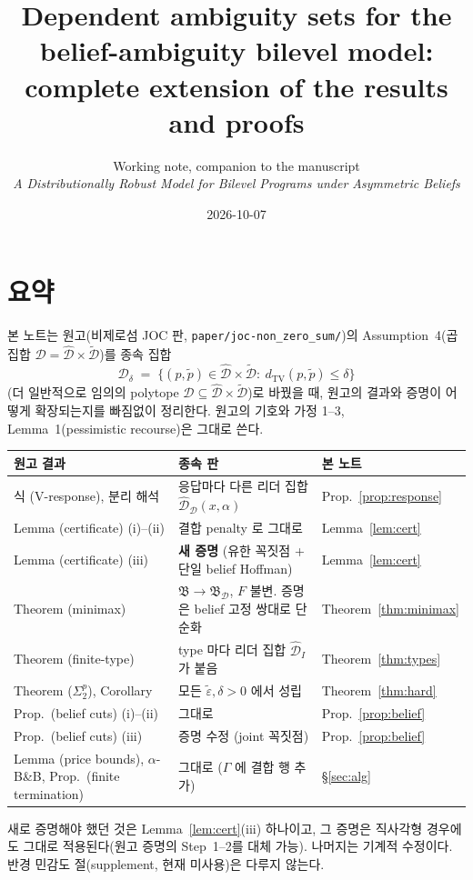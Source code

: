 \documentclass[11pt]{article}
\title{Dependent ambiguity sets for the belief-ambiguity bilevel model:\\ complete extension of the results and proofs}
\author{Working note, companion to the manuscript\\ \emph{A Distributionally Robust Model for Bilevel Programs under Asymmetric Beliefs}}
\date{2026-10-07}
\theoremstyle{definition}
\theoremstyle{remark}
\newcommand{\D}{\mathcal{D}}
\newcommand{\Dh}{\hat{\mathcal{D}}}
\newcommand{\Dt}{\tilde{\mathcal{D}}}
\newcommand{\tp}{\tilde{p}}
\newcommand{\teps}{\tilde{\varepsilon}}
\newcommand{\dtv}{d_{\mathrm{TV}}}
\newcommand{\B}{\mathfrak{B}}
\begin{document}
\maketitle

\section*{요약}

본 노트는 원고(비제로섬 JOC 판, \texttt{paper/joc-non\_zero\_sum/})의 Assumption~4(곱집합 $\D=\Dh\times\Dt$)를 종속 집합
\[
  \D_\delta \;=\; \{(p,\tp)\in\Dh\times\Dt:\ \dtv(p,\tp)\le\delta\}
\]
(더 일반적으로 임의의 polytope $\D\subseteq\Dh\times\Dt$)로 바꿨을 때, 원고의 결과와 증명이 어떻게 확장되는지를 빠짐없이 정리한다.
원고의 기호와 가정 1--3, Lemma~1(pessimistic recourse)은 그대로 쓴다.

\begin{center}
\small
\begin{tabular}{p{}p{}p{}}
\toprule
원고 결과 & 종속 판 & 본 노트 \\
\midrule
식 (V-response), 분리 해석 & 응답마다 다른 리더 집합 $\Dh_\D(x,\alpha)$ & Prop.~\ref{prop:response} \\
Lemma (certificate) (i)--(ii) & 결합 penalty 로 그대로 & Lemma~\ref{lem:cert} \\
Lemma (certificate) (iii) & \textbf{새 증명} (유한 꼭짓점 + 단일 belief Hoffman) & Lemma~\ref{lem:cert} \\
Theorem (minimax) & $\B\to\B_\D$, $F$ 불변. 증명은 belief 고정 쌍대로 단순화 & Theorem~\ref{thm:minimax} \\
Theorem (finite-type) & type 마다 리더 집합 $\Dh_I$ 가 붙음 & Theorem~\ref{thm:types} \\
Theorem ($\Sigma_2^p$), Corollary & 모든 $\teps,\delta>0$ 에서 성립 & Theorem~\ref{thm:hard} \\
Prop.\ (belief cuts) (i)--(ii) & 그대로 & Prop.~\ref{prop:belief} \\
Prop.\ (belief cuts) (iii) & 증명 수정 (joint 꼭짓점) & Prop.~\ref{prop:belief} \\
Lemma (price bounds), $\alpha$-B\&B, Prop.\ (finite termination) & 그대로 ($\Gamma$ 에 결합 행 추가) & \S\ref{sec:alg} \\
\bottomrule
\end{tabular}
\end{center}

\noindent 새로 증명해야 했던 것은 Lemma~\ref{lem:cert}(iii) 하나이고, 그 증명은 직사각형 경우에도 그대로 적용된다(원고 증명의 Step~1--2를 대체 가능).
나머지는 기계적 수정이다. 반경 민감도 절(supplement, 현재 미사용)은 다루지 않는다.
\end{document}
